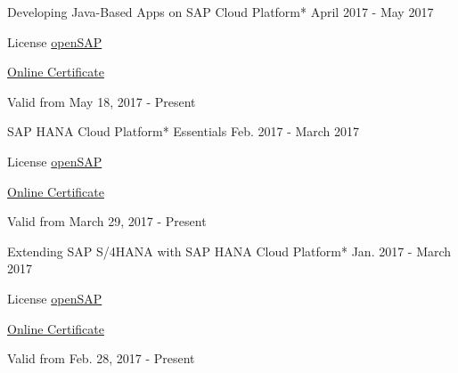 \begin{cventries}
  \cventry
    {Developing Java-Based Apps on SAP Cloud Platform*} %
    {} %
    {} %
    {April 2017 - May 2017} %
    {
	    \begin{cvitems} %
        \item {License \href{https://open.sap.com/}{openSAP}} %
        \item {\href{https://open.sap.com/verify/xuhes-rimus-bikon-roper-hicom}{Online Certificate}} %
        \item {Valid from May 18, 2017 - Present} %
      \end{cvitems}
    }    

  \cventry
    {SAP HANA Cloud Platform* Essentials} %
    {} %
    {} %
    {Feb. 2017 - March 2017} %
    {
	    \begin{cvitems} %
        \item {License \href{https://open.sap.com/}{openSAP}} %
        \item {\href{https://open.sap.com/verify/xulor-nynoz-soped-muvuv-zitek}{Online Certificate}} %
        \item {Valid from March 29, 2017 - Present} %
      \end{cvitems}
    }        
    
  \cventry
    {Extending SAP S/4HANA with SAP HANA Cloud Platform*} %
    {} %
    {} %
    {Jan. 2017 - March 2017} %
    {
	    \begin{cvitems} %
        \item {License \href{https://open.sap.com/}{openSAP}} %
        \item {\href{https://open.sap.com/verify/xugal-vaseb-firih-zadyd-deniv}{Online Certificate}} %
        \item {Valid from Feb. 28, 2017 - Present} %
      \end{cvitems}
    }
   

\end{cventries}
